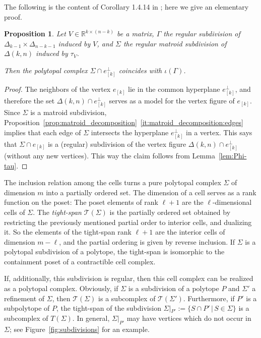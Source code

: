 \documentclass[11pt,a4paper]{amsart}
\newcommand{\RR}{{\mathbb{R}}}
\newcommand{\smallSetOf}[2]{\{#1\,|\,#2\}}
\newcommand{\Atightspan}[1]{{\mathcal{T}(#1)}}
\newcommand{\Hypersimplex}[2]{{\Delta(#1,#2)}}
\theoremstyle{plain}
\newtheorem{proposition}[theorem]{Proposition}
\theoremstyle{definition}
\begin{document}
The following is the content of Corollary 1.4.14 in \cite{MR1237834}; here we give an elementary proof.

\begin{proposition}\label{prop:vertex_figure}
  Let $V\in\RR^{k\times (n-k)}$ be a matrix, $\Gamma$ the regular subdivision of
  $\Delta_{k-1}\times\Delta_{n-k-1}$ induced by $V$, and $\Sigma$ the regular matroid subdivision of
  $\Delta(k,n)$ induced by $\tau_V$.

  Then the polytopal complex $\Sigma\cap e_{[k]}^\perp$ coincides with $\iota(\Gamma)$.
\end{proposition}

\begin{proof}
  The neighbors of the vertex $e_{[k]}$ lie in the common hyperplane $e_{[k]}^\perp$, and therefore
  the set $\Delta(k,n)\cap e_{[k]}^\perp$ serves as a model for the vertex figure of $e_{[k]}$.
  Since $\Sigma$ is a matroid subdivision,
  Proposition~\ref{prop:matroid_decomposition}~\eqref{it:matroid_decomposition:edges} implies that
  each edge of $\Sigma$ intersects the hyperplane $e_{[k]}^\perp$ in a vertex. This says that
  $\Sigma\cap e_{[k]}$ is a (regular) subdivision of the vertex figure $\Hypersimplex kn \cap
  e_{[k]}^\perp$ (without any new vertices).  This way the claim follows
  from Lemma~\ref{lem:Phi-tau}.
\end{proof}

The inclusion relation among the cells turns a pure polytopal complex $\Sigma$ of dimension $m$ into
a partially ordered set.  The dimension of a cell serves as a rank function on the poset: The poset
elements of rank $\ell+1$ are the $\ell$-dimensional cells of $\Sigma$.  The \emph{tight-span}
$\Atightspan{\Sigma}$ is the partially ordered set obtained by restricting the previously mentioned
partial order to interior cells, and dualizing it.  So the elements of the tight-span rank $\ell+1$
are the interior cells of dimension $m-\ell$, and the partial ordering is given by reverse
inclusion.  If $\Sigma$ is a polytopal subdivision of a polytope, the tight-span is isomorphic to
the containment poset of a contractible cell complex.

If, additionally, this subdivision is regular, then this cell complex can be realized as a polytopal
complex. Obviously, if $\Sigma$ is a subdivision of a polytope $P$ and $\Sigma'$ a refinement of
$\Sigma$, then $\Atightspan\Sigma$ is a subcomplex of $\Atightspan{\Sigma'}$. Furthermore, if $P'$
is a subpolytope of $P$, the tight-span of the subdivision $\Sigma|_{P'}:=\smallSetOf{S\cap
  P'}{S\in\Sigma}$ is a subcomplex of $T(\Sigma)$.  In general, $\Sigma|_{P'}$ may have vertices
which do not occur in $\Sigma$; see Figure~\ref{fig:subdivisions} for an example.
\end{document}
